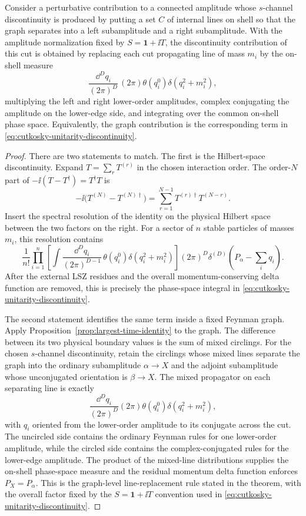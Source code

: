 \begin{theorem}
\label{thm:cutkosky-cut-rule-perturbative-physical-cut}
Consider a perturbative contribution to a connected amplitude whose
\(s\)-channel discontinuity is produced by putting a set \(C\) of internal
lines on shell so that the graph separates into a left subamplitude and a right
subamplitude.  With the amplitude normalization fixed by \(S=\mathbf 1+\ii T\),
the discontinuity contribution of this cut is obtained by replacing each cut
propagating line of mass \(m_i\) by the on-shell measure
\[
  \frac{\dd^D q_i}{(2\pi)^D}\,
  (2\pi)\theta(q_i^0)\delta(q_i^2+m_i^2),
\]
multiplying the left and right lower-order amplitudes, complex conjugating the
amplitude on the lower-edge side, and integrating over the common on-shell
phase space.  Equivalently, the graph contribution is the corresponding term in
\eqref{eq:cutkosky-unitarity-discontinuity}.
\end{theorem}

\begin{proof}
There are two statements to match.  The first is the Hilbert-space
discontinuity.  Expand \(T=\sum_r T^{(r)}\) in the chosen interaction order.
The order-\(N\) part of \(-\ii(T-T^\dagger)=T^\dagger T\) is
\[
  -\ii\bigl(T^{(N)}-T^{(N)\dagger}\bigr)
  =
  \sum_{r=1}^{N-1}T^{(r)\dagger}T^{(N-r)} .
\]
Insert the spectral resolution of the identity on the physical Hilbert space
between the two factors on the right.  For a sector of \(n\) stable particles of
masses \(m_i\), this resolution contains
\[
  \frac1{n!}
  \prod_{i=1}^n
  \left[
    \int\frac{\dd^D q_i}{(2\pi)^{D-1}}\,
    \theta(q_i^0)\delta(q_i^2+m_i^2)
  \right]
  (2\pi)^D\delta^{(D)}\!\left(P_\alpha-\sum_i q_i\right).
\]
After the external LSZ residues and the overall momentum-conserving delta
function are removed, this is precisely the phase-space integral in
\eqref{eq:cutkosky-unitarity-discontinuity}.

The second statement identifies the same term inside a fixed Feynman graph.
Apply Proposition~\ref{prop:largest-time-identity} to the graph.  The
difference between its two physical boundary values is the sum of mixed
circlings.  For the chosen \(s\)-channel discontinuity, retain the circlings
whose mixed lines separate the graph into the ordinary subamplitude
\(\alpha\to X\) and the adjoint subamplitude whose unconjugated orientation is
\(\beta\to X\).  The mixed propagator on each separating line is exactly
\[
  \frac{\dd^D q_i}{(2\pi)^D}
  (2\pi)\theta(q_i^0)\delta(q_i^2+m_i^2),
\]
with \(q_i\) oriented from the lower-order amplitude to its conjugate across
the cut.  The uncircled side contains the ordinary Feynman rules for one
lower-order amplitude, while the circled side contains the complex-conjugated
rules for the lower-edge amplitude.  The product of the mixed-line
distributions supplies the on-shell phase-space measure and the residual
momentum delta function enforces \(P_X=P_\alpha\).  This is the graph-level
line-replacement rule stated in the theorem, with the overall factor fixed by
the \(S=\mathbf1+\ii T\) convention used in
\eqref{eq:cutkosky-unitarity-discontinuity}.
\end{proof}

